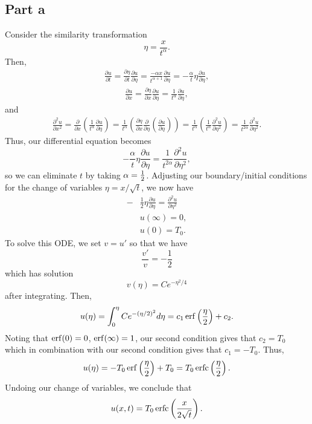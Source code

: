 \documentclass{article}
\begin{document}
\subsection{Part a}
Consider the similarity transformation
\[
\eta=\frac{x}{t^\alpha}.
\]
Then,
\begin{align*}
\frac{\partial u}{\partial t}=\frac{\partial \eta}{\partial t}\frac{\partial u}{\partial \eta}=\frac{-\alpha x}{t^{\alpha+1}}\frac{\partial u}{\partial \eta}=-\frac{\alpha}{t}\eta\frac{\partial u}{\partial \eta},
\end{align*}
\begin{align*}
\frac{\partial u}{\partial x}=\frac{\partial \eta}{\partial x}\frac{\partial u}{\partial \eta}=\frac{1}{t^\alpha}\frac{\partial u}{\partial \eta},
\end{align*}
and
\begin{align*}
\frac{\partial^2 u}{\partial x^2}=\frac{\partial}{\partial x}\left(\frac{1}{t^\alpha}\frac{\partial u}{\partial \eta}\right)=\frac{1}{t^\alpha}\left(\frac{\partial \eta}{\partial x}\frac{\partial}{\partial \eta}\left(\frac{\partial u}{\partial \eta}\right)\right)=\frac{1}{t^\alpha}\left(\frac{1}{t^\alpha}\frac{\partial^2 u}{\partial \eta^2}\right)=\frac{1}{t^{2\alpha}}\frac{\partial^2 u}{\partial \eta^2}.
\end{align*}
Thus, our differential equation becomes 
\[
-\frac{\alpha}{t}\eta\frac{\partial u}{\partial \eta}=\frac{1}{t^{2\alpha}}\frac{\partial^2 u}{\partial \eta^2},
\]
so we can eliminate $t$ by taking $\alpha=\mbox{$\frac{1}{2}$}$. Adjusting our boundary/initial conditions for the change of variables $\eta=x/\sqrt{t}$, we now have
\begin{align*}
	-&\frac{1}{2}\eta\frac{\partial u}{\partial \eta}=\frac{\partial^2 u}{\partial \eta^2}\\
	&u(\infty)=0,\\
	&u(0)=T_0.
\end{align*}
To solve this ODE, we set $v=u'$ so that we have
\[
\frac{v'}{v}=-\frac{1}{2}
\]
which has solution
\[
v(\eta)=Ce^{-\eta^2/4}
\]
after integrating. Then,
\[
u(\eta)=\int_0^\eta Ce^{-(\eta/2)^2}d\eta=c_1\operatorname{erf}\left(\frac{\eta}{2}\right)+c_2.
\]
Noting that $\operatorname{erf}(0)=0$, $\operatorname{erf}(\infty)=1$, our second condition gives that $c_2=T_0$ which in combination with our second condition gives that $c_1=-T_0$. Thus,
\[
u(\eta)=-T_0\operatorname{erf}\left(\frac{\eta}{2}\right)+T_0=T_0\operatorname{erfc}\left(\frac{\eta}{2}\right).
\]	
Undoing our change of variables, we conclude that 
\[
u(x,t)=T_0\operatorname{erfc}\left(\frac{x}{2\sqrt{t}}\right).
\]
\end{document}
